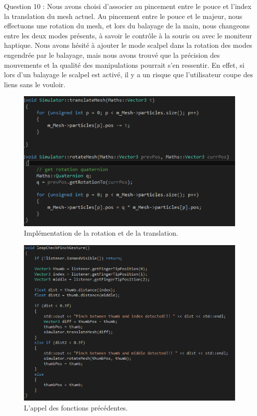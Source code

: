 \documentclass[a4paper,12pt]{article}
\begin{document}
Question 10 : Nous avons choisi d'associer au pincement entre le pouce et l'index la translation du mesh actuel. Au pincement entre le pouce et le majeur, nous effectuons une rotation du mesh, et lors du balayage de la main, nous changeons entre les deux modes présents, à savoir le contrôle à la souris ou avec le moniteur haptique. Nous avons hésité à ajouter le mode \og{}scalpel\fg{} dans la rotation des modes engendrée par le balayage, mais nous avons trouvé que la précision des mouvements et la qualité des manipulations pourrait s'en ressentir. En effet, si lors d'un balayage le scalpel est activé, il y a un risque que l'utilisateur coupe des liens sans le vouloir.
\begin{figure}
  \centering
  \includegraphics{images/swipe_pinch_code.png}
  \caption{Implémentation de la rotation et de la translation.}
  \label{fig:pinchSwipe}
\end{figure}
\begin{figure}
  \centering
  \includegraphics{images/swipe_pinch_appel.png}
  \caption{L'appel des fonctions précédentes.}
  \label{fig:}
\end{figure}
\end{document}
